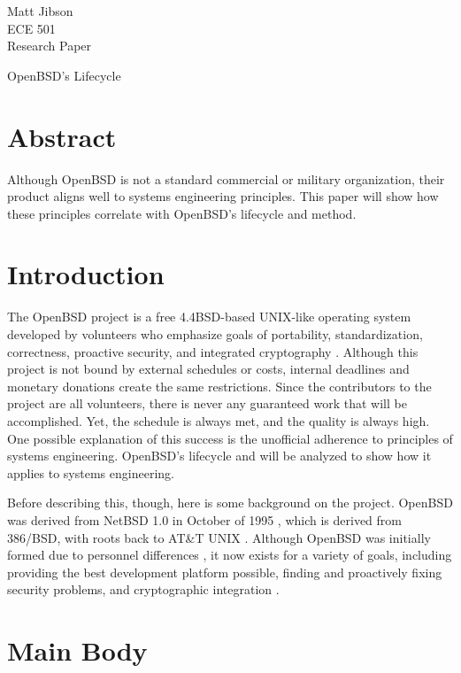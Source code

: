 \documentclass[12pt]{article}
\begin{document}
\begin{flushright}
Matt Jibson \\
ECE 501 \\
Research Paper
\end{flushright}

\begin{center}
\Large OpenBSD's Lifecycle
\end{center}

{\setlength{\baselineskip}{1.6\baselineskip}

\section*{Abstract}

Although OpenBSD is not a standard commercial or military organization, their product aligns well to systems engineering principles. This paper will show how these principles correlate with OpenBSD's lifecycle and method.

\section*{Introduction}

The OpenBSD project is a free 4.4BSD-based UNIX-like operating system developed by volunteers who emphasize goals of portability, standardization, correctness, proactive security, and integrated cryptography \cite{openbsd}. Although this project is not bound by external schedules or costs, internal deadlines and monetary donations create the same restrictions. Since the contributors to the project are all volunteers, there is never any guaranteed work that will be accomplished. Yet, the schedule is always met, and the quality is always high. One possible explanation of this success is the unofficial adherence to principles of systems engineering. OpenBSD's lifecycle and will be analyzed to show how it applies to systems engineering.

Before describing this, though, here is some background on the project. OpenBSD was derived from NetBSD 1.0 in October of 1995 \cite{openbsd-cvs-makefile-rev-1}, which is derived from 386/BSD, with roots back to AT\&T UNIX \cite{voices}. Although OpenBSD was initially formed due to personnel differences \cite{coremail}, it now exists for a variety of goals, including providing the best development platform possible, finding and proactively fixing security problems, and cryptographic integration \cite{goals}.

\section*{Main Body}

}
\end{document}
